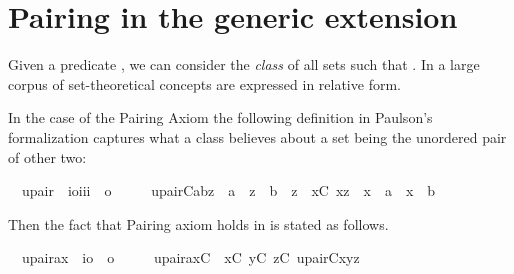 \section{Pairing in the generic extension}
\label{sec:pairing-generic-extension}
Given a predicate
,
we can consider the \emph{class} of all sets  such that
. In \cite{MR2507047} a large corpus of set-theoretical
concepts are expressed in relative form.

In the case of the Pairing Axiom the following definition in 
Paulson's formalization captures
what a class  believes about a set being the unordered pair of
other two:
\begin{isabelle}
\isamarkupfalse%
\isanewline
\ \ upair\ {\isacharcolon}{\isacharcolon}\ {\isachardoublequoteopen}{\isacharbrackleft}i{\isasymRightarrow}o{\isacharcomma}i{\isacharcomma}i{\isacharcomma}i{\isacharbrackright}\ {\isasymRightarrow}\ o{\isachardoublequoteclose}\ \isanewline
\ \ \ \ {\isachardoublequoteopen}upair{\isacharparenleft}C{\isacharcomma}a{\isacharcomma}b{\isacharcomma}z{\isacharparenright}\ {\isacharequal}{\isacharequal}\ a\ {\isasymin}\ z\ {\isasymand}\ b\ {\isasymin}\ z\ {\isasymand}\ {\isacharparenleft}{\isasymforall}x{\isacharbrackleft}C{\isacharbrackright}{\isachardot}\ x{\isasymin}z\ {\isasymlongrightarrow}\ x\ {\isacharequal}\ a\ {\isasymor}\ x\ {\isacharequal}\ b{\isacharparenright}{\isachardoublequoteclose}
\end{isabelle}
%
Then the fact that Pairing axiom holds in  is stated as follows.
%
\begin{isabelle}
\isamarkupfalse%
\isanewline
\ \ upair{\isacharunderscore}ax\ {\isacharcolon}{\isacharcolon}\ {\isachardoublequoteopen}{\isacharparenleft}i{\isasymRightarrow}o{\isacharparenright}\ {\isasymRightarrow}\ o{\isachardoublequoteclose}\ \isanewline
\ \ \ \ {\isachardoublequoteopen}upair{\isacharunderscore}ax{\isacharparenleft}C{\isacharparenright}\ {\isacharequal}{\isacharequal}\ {\isasymforall}x{\isacharbrackleft}C{\isacharbrackright}{\isachardot}\ {\isasymforall}y{\isacharbrackleft}C{\isacharbrackright}{\isachardot}\ {\isasymexists}z{\isacharbrackleft}C{\isacharbrackright}{\isachardot}\ upair{\isacharparenleft}C{\isacharcomma}x{\isacharcomma}y{\isacharcomma}z{\isacharparenright}{\isachardoublequoteclose}
\end{isabelle}

